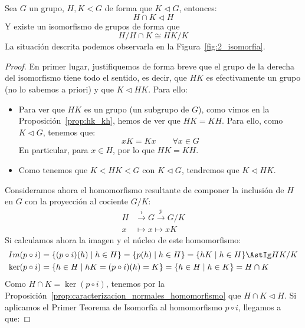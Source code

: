 \begin{teo}\label{teo:2_isomorfia}
    Sea $G$ un grupo, $H,K<G$ de forma que $K\lhd G$, entonces:
    \begin{equation*}
        H\cap K \lhd H
    \end{equation*}
    Y existe un isomorfismo de grupos de forma que
    \begin{equation*}
        H/H\cap K \cong HK/K
    \end{equation*}
    La situación descrita podemos observarla en la Figura~\ref{fig:2_isomorfia}.
    \begin{proof}
        En primer lugar, justifiquemos de forma breve que el grupo de la derecha del isomorfismo tiene todo el sentido, es decir, que $HK$ es efectivamente un grupo (no lo sabemos a priori) y que $K\lhd HK$. Para ello:
        \begin{itemize}
            \item Para ver que $HK$ es un grupo (un subgrupo de $G$), como vimos en la Proposición~\ref{prop:hk_kh}, hemos de ver que $HK = KH$. Para ello, como $K\lhd G$, tenemos que:
                \begin{equation*}
                    xK = Kx \qquad \forall x\in G
                \end{equation*}
                En particular, para $x\in H$, por lo que $HK = KH$.
            \item Como tenemos que $K < HK < G$ con $K\lhd G$, tendremos que $K\lhd HK$.
        \end{itemize}
        Consideramos ahora el homomorfismo resultante de componer la inclusión de $H$ en $G$ con la proyección al cociente $G/K$:
        \begin{align*}
            H&\stackrel{i}{\longrightarrow} G \stackrel{p}{\longrightarrow} G/K \\
            x&\longmapsto x \longmapsto xK
        \end{align*}
        Si calculamos ahora la imagen y el núcleo de este homomorfismo:
        \begin{align*}
            Im(p\circ i) &= \{(p\circ i)(h) \mid h \in H\} = \{p(h) \mid h \in H \} = \{hK \mid h\in H\} \AstIg HK/K \\
            \ker(p\circ i) &= \{h\in H \mid hK = (p\circ i)(h) = K\} = \{h\in H \mid h\in K\} = H\cap K
        \end{align*}
        Como $H \cap K = \ker(p\circ i)$, tenemos por la Proposición~\ref{prop:caracterizacion_normales_homomorfismo} que $H\cap K\lhd H$. Si aplicamos el Primer Teorema de Isomorfía al homomorfismo $p\circ i$, llegamos a que:

\end{proof}
\end{teo}
